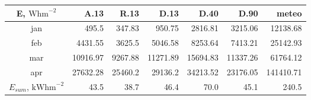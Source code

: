 \begin{tabular}{ | c | r r r r r r | }\hline
E, $\textrm{Whm}^{-2}$	&A.13	&R.13	&D.13	&D.40	&D.90	&meteo\\ \hline
jan		&495.5	&347.83	&950.75	&2816.81	&3215.06	&12138.68\\
feb		&4431.55	&3625.5	&5046.58	&8253.64	&7413.21	&25142.93\\
mar		&10916.97	&9267.88	&11271.89	&15694.83	&11337.26	&61764.12\\
apr		&27632.28	&25460.2	&29136.2	&34213.52	&23176.05	&141410.71\\ \hline
$E_{sum}$, $\textrm{kWhm}^{-2}$	&43.5	&38.7	&46.4	&70.0		&45.1	&240.5\\ \hline
\end{tabular}